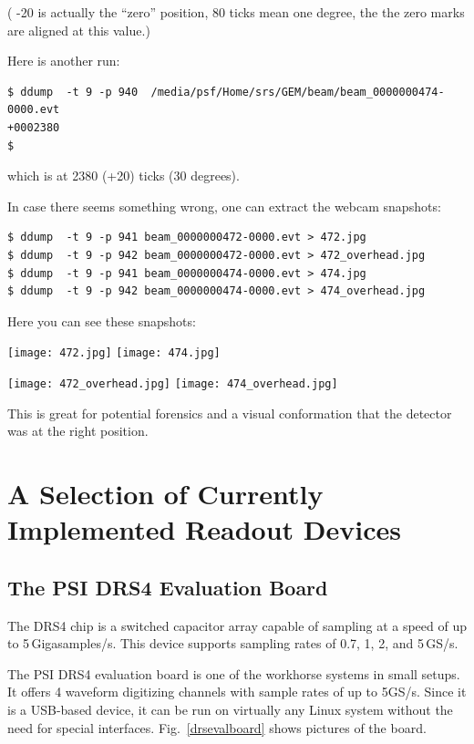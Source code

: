 \documentclass{article}[11pt]
\begin{document}
( -20 is actually the ``zero'' position, 80 ticks mean one degree, the the zero marks are aligned at this value.)

Here is another run:

\begin{verbatim} 
$ ddump  -t 9 -p 940  /media/psf/Home/srs/GEM/beam/beam_0000000474-0000.evt
+0002380
$ 
\end{verbatim} 

which is at 2380 (+20) ticks (30 degrees).

In case there seems something wrong, one can extract the webcam snapshots:

\begin{verbatim} 
$ ddump  -t 9 -p 941 beam_0000000472-0000.evt > 472.jpg
$ ddump  -t 9 -p 942 beam_0000000472-0000.evt > 472_overhead.jpg
$ ddump  -t 9 -p 941 beam_0000000474-0000.evt > 474.jpg
$ ddump  -t 9 -p 942 beam_0000000474-0000.evt > 474_overhead.jpg
\end{verbatim} 

Here you can see these snapshots:

\texttt{[image: 472.jpg]}
\texttt{[image: 474.jpg]}

\texttt{[image: 472\_overhead.jpg]}
\texttt{[image: 474\_overhead.jpg]}

This is great for potential forensics and a visual conformation that the detector
was at the right position. 



\section{A Selection of Currently Implemented Readout Devices}

\subsection{The PSI DRS4 Evaluation Board}
\label{instructions}

The DRS4 chip is a switched capacitor array capable of sampling at a
speed of up to 5\,Gigasamples/s. This device supports sampling rates
of 0.7, 1, 2, and 5\,GS/s. 

The PSI DRS4 evaluation board is one of the workhorse systems in small
setups. It offers 4 waveform digitizing channels with sample rates of
up to 5GS/s. Since it is a USB-based device, it can be run on
virtually any Linux system without the need for special
interfaces. Fig.~\ref{drsevalboard} shows pictures of the board.
\end{document}
